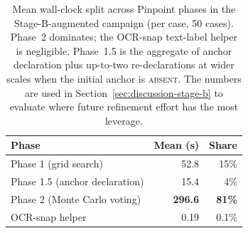 \documentclass[sigconf,nonacm]{acmart}
\begin{document}
\begin{table}[t]
\caption{OCR-snap text-label helper (Post-Phase~1) activation
  outcomes on the Stage-B-augmented campaign.  The helper is
  effective only when (a) the target description contains a quoted
  text label and (b) Phase~1 lands inside the OCR-detected text
  bbox.  No case in this campaign satisfied both conditions; we
  document this as evidence of the method's narrow scope, which
  motivates the semantic-geometric successor sketched in
  Section~\ref{sec:discussion-stage-b}.}
\label{tab:stage-b-scope}
\small
{}
\end{table}

\begin{table}[t]
\caption{Mean wall-clock split across Pinpoint phases in the
  Stage-B-augmented campaign (per case, 50 cases).  Phase~2
  dominates; the OCR-snap text-label helper is negligible.
  Phase~1.5 is the aggregate of anchor
  declaration plus up-to-two re-declarations at wider scales when the
  initial anchor is \textsc{absent}.  The numbers are used in
  Section~\ref{sec:discussion-stage-b} to evaluate where future
  refinement effort has the most leverage.}
\label{tab:phase-split}
\small
\begin{tabular}{@{}lrr@{}}
\toprule
\textbf{Phase} & \textbf{Mean (s)} & \textbf{Share} \\
\midrule
Phase 1 (grid search)           & 52.8  & 15\% \\
Phase 1.5 (anchor declaration)  & 15.4  & 4\%  \\
Phase 2 (Monte Carlo voting)    & \textbf{296.6} & \textbf{81\%} \\
OCR-snap helper                 & 0.19  & 0.1\% \\
\bottomrule
\end{tabular}
\end{table}
\end{document}
